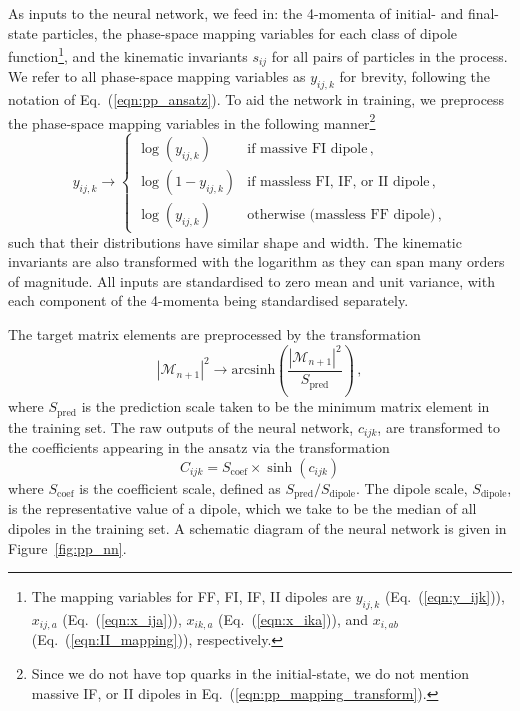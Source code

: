 \documentclass[main.tex]{subfiles}
\begin{document}
As inputs to the neural network, we feed in: the 4-momenta of initial-
and final-state particles, the phase-space mapping variables for each
class of dipole function\footnote{The mapping variables for FF, FI, IF, II dipoles are $y_{ij,k}$ (Eq.~(\ref{eqn:y_ijk})), $x_{ij,a}$ (Eq.~(\ref{eqn:x_ija})), $x_{ik,a}$ (Eq.~(\ref{eqn:x_ika})), and $x_{i,ab}$ (Eq.~(\ref{eqn:II_mapping})), respectively.},
and the kinematic invariants $s_{ij}$ for all pairs of particles in
the process. We refer to all phase-space mapping variables
as $y_{ij,k}$ for brevity, following the notation of
Eq.~(\ref{eqn:pp_ansatz}). To aid the network in training, we preprocess
the phase-space mapping variables in the following manner\footnote{Since we do not
have top quarks in the initial-state, we do not mention massive IF, or II dipoles in Eq.~(\ref{eqn:pp_mapping_transform}).}
\begin{equation}
    y_{ij,k} \rightarrow
    \begin{cases}
        \log(y_{ij,k})   & \text{if massive FI dipole} \, , \\
        \log(1-y_{ij,k}) & \text{if massless FI, IF, or II dipole} \, ,\\
        \log(y_{ij,k})   & \text{otherwise (massless FF dipole)} \, ,
    \end{cases}
    \label{eqn:pp_mapping_transform}
\end{equation}
such that their distributions have similar shape and width. The kinematic invariants
are also transformed with the logarithm as they can span many orders
of magnitude. All inputs are standardised to zero mean and unit variance,
with each component of the 4-momenta being standardised separately.

The target matrix elements are preprocessed by the transformation
\begin{equation}
    |\mathcal{M}_{n+1}|^{2} \rightarrow \mathrm{arcsinh}\left(\dfrac{|\mathcal{M}_{n+1}|^{2}}{S_{\mathrm{pred}}}\right) \, ,
    \label{eqn:pp_me_transform}
\end{equation}
where $S_{\mathrm{pred}}$ is the prediction scale taken to be the
minimum matrix element in the training set. The raw outputs of the
neural network, $c_{ijk}$, are transformed to the coefficients appearing
in the ansatz via the transformation
\begin{equation}
    C_{ijk} = S_{\mathrm{coef}} \times \sinh(c_{ijk})
    \label{eqn:pp_coefs_transform}
\end{equation}
where $S_{\mathrm{coef}}$ is the coefficient scale, defined
as $S_{\mathrm{pred}}/S_{\mathrm{dipole}}$. The dipole scale,
$S_{\mathrm{dipole}}$, is the representative value of a dipole,
which we take to be the median of all dipoles in the training set.
A schematic diagram of the neural network is given in Figure~\ref{fig:pp_nn}.
\end{document}
